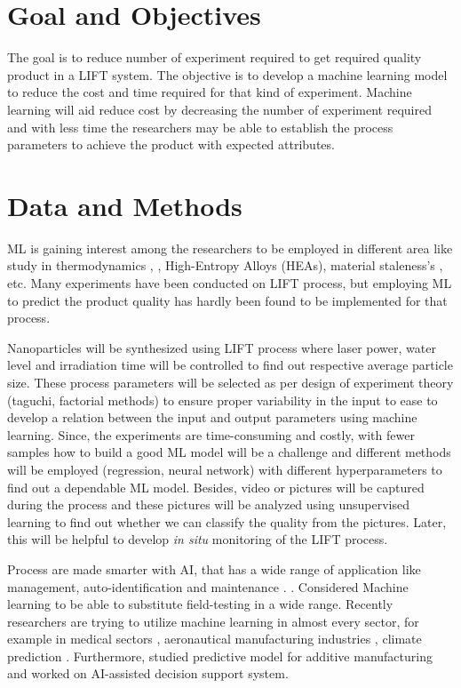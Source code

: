 \documentclass[letterpaper]{article}
\begin{document}
\section*{Goal and Objectives}
The goal is to reduce number of experiment required to get required quality product in a LIFT system. The objective is to develop a machine learning model to reduce the cost and time required for that kind of experiment. Machine learning will aid reduce cost by decreasing the number of experiment required and with less time the researchers may be able to establish the process parameters to achieve the product with expected attributes.

\section*{Data and Methods}
ML is gaining interest among the researchers to be employed in different area like study in thermodynamics \parencite[]{ding}, \parencite[]{thermal},  High-Entropy Alloys (HEAs)\parencite[]{qiao}, material staleness's \parencite[]{he}, etc. Many experiments have been conducted on LIFT process, but employing ML to predict the product quality has hardly been found to be implemented for that process.
\par
Nanoparticles will be synthesized using LIFT process where laser power, water level and irradiation time will be controlled to find out respective average particle size. These process parameters will be selected as per design of experiment theory (taguchi, factorial methods) to ensure proper variability in the input to ease to develop a relation between the input and output parameters using machine learning. Since, the experiments are time-consuming and costly, with fewer samples how to build a good ML model will be a challenge and different methods will be employed (regression, neural network) with different hyperparameters to find out a dependable ML model. Besides, video or pictures will be captured during the process and these pictures will be analyzed using unsupervised learning to find out whether we can classify the quality from the pictures. Later, this will be helpful to develop \textit{in situ} monitoring of the LIFT process.\par
Process are made smarter with AI, that has a wide range of application like management, auto-identification and maintenance \parencite[]{xu}. \parencite[]{bourhis}. Considered Machine learning to be able to substitute field-testing in a wide range. Recently researchers are trying to utilize machine learning in almost every sector, for example in medical sectors \parencite[]{twin}, aeronautical manufacturing industries \parencite[]{zohdi}, climate prediction \parencite[]{koc}.  Furthermore, \parencite[]{tapia}  studied predictive model for additive manufacturing and \parencite[]{kharchenko} worked on AI-assisted decision support system.
\end{document}
